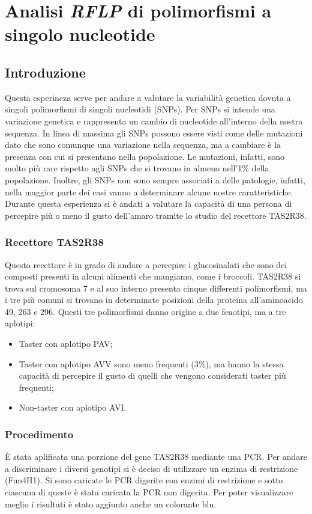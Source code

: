 \section*{Analisi \emph{RFLP} di polimorfismi a singolo nucleotide}

	\subsection*{Introduzione}
	Questa esperineza serve per andare a valutare la variabilità genetica dovuta a singoli polimorfismi di singoli nucleotidi (SNPs). Per SNPs si intende una variazione genetica e rappresenta un cambio di nucleotide all'interno della nostra sequenza. In linea di massima gli SNPs possono essere visti come delle mutazioni dato che sono comunque una variazione nella sequenza, ma a cambiare è la presenza con cui si presentano nella popolazione. Le mutazioni, infatti, sono molto più rare  rispetto agli SNPs che si trovano in almeno nell'1$\%$ della popolazione. Inoltre, gli SNPs non sono sempre associati a delle patologie, infatti, nella maggior parte dei casi vanno a determinare alcune nostre caratteristiche. 
	Durante questa esperienza si è andati a valutare la capacità di una persona di percepire più o meno il gusto dell'amaro tramite lo studio del recettore TAS2R38. 
	
	    \subsubsection{Recettore TAS2R38}
	    Questo recettore è in grado di andare a percepire i glucosinalati che sono dei composti presenti in alcuni alimenti che mangiamo, come i broccoli. 
	    TAS2R38 si trova sul cromosoma 7 e al suo interno presenta cinque differenti polimorfismi, ma i tre più comuni si trovano in determinate posizioni della proteina all'aminoacido 49, 263 e 296. Questi tre polimorfismi danno origine a due fenotipi, ma a tre aplotipi: 
	    	\begin{itemize}
				\item Taster con aplotipo PAV;
				\item Taster con aplotipo AVV sono meno frequenti (3$\%$), ma hanno la stessa capacità di percepire il gusto di quelli che vengono considerati taster più frequenti;
				\item Non-taster con aplotipo AVI. 
			\end{itemize}
	
	    
	    \subsubsection{Procedimento}
	    È stata aplificata una porzione del gene TAS2R38 mediante una PCR. Per andare a discriminare i diversi genotipi si è deciso di utilizzare un enzima di restrizione (Fun4H1). 
	    Si sono caricate le PCR digerite con enzimi di restrizione e sotto ciascuna di queste è stata caricata la PCR non digerita. Per poter visualizzare meglio i risultati è stato aggiunto anche un colorante blu. 
	   
